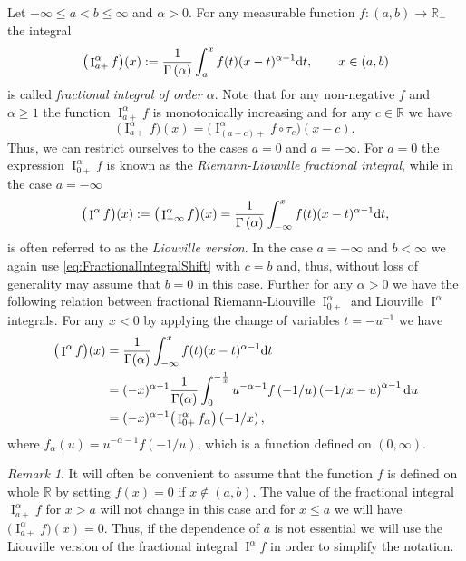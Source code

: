 \documentclass[11pt,a4paper]{article}
\theoremstyle{plain}
\theoremstyle{definition}
\theoremstyle{remark}
\newtheorem{remark}[theorem]{Remark}
\def\RR{\mathbb{R}}
\newcommand{\dd}{{\rm d}}
\newcommand{\frI}{\mathop{\mathrm{I}}\nolimits}
\begin{document}
Let $-\infty \le a < b \le \infty$ and $\alpha >0$. For any measurable function $f\colon (a,b)\to \RR_+$ the integral
\[
    \big(\frI_{a+}^{\alpha}f\big)(x):=\frac{1}{\Gamma\left(\alpha\right)} \int_{a}^{x} f(t) (x-t)^{\alpha-1}\dd t,\qquad x\in (a,b)
\]
is called \textit{fractional integral of order $\alpha$}. Note that for any non-negative $f$ and $\alpha\ge 1$ the function $\frI_{a+}^{\alpha}f$ is monotonically increasing and for any $c\in \RR$ we have
\begin{equation}\label{eq:FractionalIntegralShift}
    \big(\frI_{a+}^{\alpha}f\big)(x)
    =\big(\frI_{(a-c)+}^{\alpha}f\circ \tau_c\big)(x-c).
\end{equation}
Thus, we can restrict ourselves to the cases $a=0$ and $a=-\infty$. For $a=0$ the expression $\frI_{0+}^{\alpha}f$ is known as the \textit{Riemann-Liouville fractional integral}, while in the case $a=-\infty$ 
\begin{equation}\label{eq:Frac_Int}
    \big(\frI^{\alpha}f\big)(x):=\big(\frI^{\alpha}_{-\infty}f\big)(x)=\frac{1}{\Gamma\left(\alpha\right)} \int_{-\infty}^{x} f(t) (x-t)^{\alpha-1}\dd t,
\end{equation}
is often referred to as the \textit{Liouville version}. In the case $a=-\infty$ and $b<\infty$ we again use \eqref{eq:FractionalIntegralShift} with $c=b$ and, thus, without loss of generality may assume that $b=0$ in this case. Further for any $\alpha>0$ we have the following relation between fractional Riemann-Liouville $\frI_{0+}^{\alpha}$ and Liouville $\frI^{\alpha}$ integrals. For any $x<0$ by applying the change of variables $t=-u^{-1}$ we have
    \begin{equation}\label{eq:frac_f_g}
        \begin{aligned}
            \big(\frI^{\alpha}f\big)(x)&=\frac{1}{\Gamma(\alpha)}\int_{-\infty}^{x}f(t)(x-t)^{\alpha-1} \dd t\\
            &=(-x)^{\alpha-1}\frac{1}{\Gamma(\alpha)}\int_{0}^{-\frac{1}{x}}u^{-\alpha-1}f\left(-1/u\right)\left(-1/x-u\right)^{\alpha-1}\dd u\\
            &=(-x)^{\alpha-1}\big(\frI_{0+}^\alpha f_\alpha\big)\left(-1/x\right),    
        \end{aligned}
    \end{equation} 
    where $f_{\alpha}(u)=u^{-\alpha-1}f(-1/u)$, which is a function defined on $(0,\infty)$. 

\begin{remark}\label{rem:convention}
    It will often be convenient to assume that the function $f$ is defined on whole $\RR$ by setting $f(x)=0$ if $x\not\in (a,b)$. The value of the fractional integral $\frI_{a+}^{\alpha}f$ for $x>a$ will not change in this case and for $x\leq a$ we will have $ \big(\frI_{a+}^{\alpha}f\big)(x)=0$. Thus, if the dependence of $a$ is not essential we will use the Liouville version of the fractional integral $\frI^{\alpha}f$ in order to simplify the notation. 
    \end{remark}
    
\end{document}
